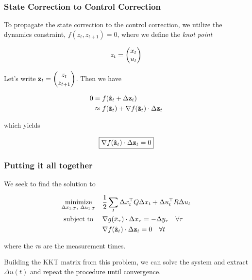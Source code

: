 \documentclass{article}
\begin{document}
\newpage
\subsubsection*{State Correction to Control Correction}

To propagate the state correction to the control correction, we utilize the dynamics constraint, $f(z_t, z_{t+1}) = 0$, where we define the \textit{knot point} 

$$
z_t =\mqty(x_t \\ u_t)
$$


Let's write $\vb{z}_t = \mqty(z_t \\ z_{t+1})$. Then we have

\begin{align*}
0 &= f( \hat{\vb{z}}_t + \Delta {\vb{z}}_t) \\
&\approx f(\hat{\vb{z}}_t) + \nabla f(\hat{\vb{z}}_t) \cdot \Delta {\vb{z}}_t \\
\end{align*}


which yields

\begin{equation}
  \boxed{
  \nabla f(\hat{\vb{z}}_t) \cdot \Delta {\vb{z}}_t = 0
  }
\end{equation}


\subsubsection*{Putting it all together}

We seek to find the solution to

\begin{align*}
  \underset{\Delta x_{1:T},\ \Delta u_{1:T}}{\text{minimize}} & \quad \frac{1}{2} \sum_t \Delta x^\top_t Q \Delta x_t + \Delta u^\top_t R \Delta u_t \\
  \text{subject to} \ & \quad \nabla g(\bar x_\tau) \cdot \Delta x_\tau = - \Delta y_\tau \quad \forall \tau \\
  & \quad \nabla f(\hat{\vb{z}}_t) \cdot \Delta {\vb{z}}_t = 0 \quad \forall t
\end{align*}


where the $\tau$s are the measurement times.

\hfill


Building the KKT matrix from this problem, we can solve the system and extract $\Delta u(t)$ and repeat the procedure until convergence.

\hfill
\end{document}
